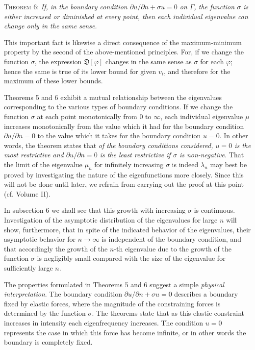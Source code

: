 \textsc{Theorem 6:} \emph{If, in the boundary condition $\partial u/\partial n+\sigma u=0$ on $\Gamma$, the function $\sigma$ is either increased or diminished at every point, then each individual eigenvalue can change only in the same sense.}

This important fact is likewise a direct consequence of the maximum-minimum property by the second of the above-mentioned principles. For, if we change the function $\sigma$, the expression $\mathfrak D[\varphi]$ changes in the same sense as $\sigma$ for each $\varphi$; hence the same is true of its lower bound for given $v_i$, and therefore for the maximum of these lower bounds.

Theorems 5 and 6 exhibit a mutual relationship between the eigenvalues corresponding to the various types of boundary conditions. If we change the function $\sigma$ at each point monotonically from $0$ to $\infty$, each individual eigenvalue $\mu$ increases monotonically from the value which it had for the boundary condition $\partial u/\partial n=0$ to the value which it takes for the boundary condition $u=0$. In other words, the theorem states that \emph{of the boundary conditions considered, $u=0$ is the most restrictive and $\partial u/\partial n=0$ is the least restrictive if $\sigma$ is non-negative.} That the limit of the eigenvalue $\mu_n$ for infinitely increasing $\sigma$ is indeed $\lambda_n$ may best be proved by investigating the nature of the eigenfunctions more closely. Since this will not be done until later, we refrain from carrying out the proof at this point (cf. Volume II).

In subsection 6 we shall see that this growth with increasing $\sigma$ is continuous. Investigation of the asymptotic distribution of the eigenvalues for large $n$ will show, furthermore, that in spite of the indicated behavior of the eigenvalues, their asymptotic behavior for $n\to\infty$ is independent of the boundary condition, and that accordingly the growth of the $n$-th eigenvalue due to the growth of the function $\sigma$ is negligibly small compared with the size of the eigenvalue for sufficiently large $n$.

The properties formulated in Theorems 5 and 6 suggest a simple \emph{physical interpretation}. The boundary condition $\partial u/\partial n+\sigma u=0$ describes a boundary fixed by elastic forces, where the magnitude of the constraining forces is determined by the function $\sigma$. The theorems state that as this elastic constraint increases in intensity each eigenfrequency increases. The condition $u=0$ represents the case in which this force has become infinite, or in other words the boundary is completely fixed.

